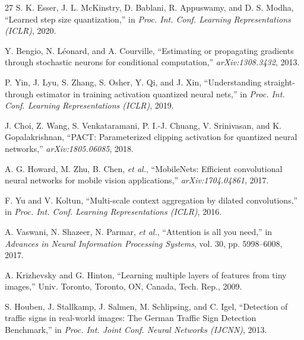 \documentclass[lettersize,journal]{IEEEtran}
\begin{document}
\begin{thebibliography}{27}
S. K. Esser, J. L. McKinstry, D. Bablani, R. Appuswamy, and D. S. Modha, ``Learned step size quantization,'' in \emph{Proc. Int. Conf. Learning Representations (ICLR)}, 2020.

Y. Bengio, N. L\'eonard, and A. Courville, ``Estimating or propagating gradients through stochastic neurons for conditional computation,'' \emph{arXiv:1308.3432}, 2013.

P. Yin, J. Lyu, S. Zhang, S. Osher, Y. Qi, and J. Xin, ``Understanding straight-through estimator in training activation quantized neural nets,'' in \emph{Proc. Int. Conf. Learning Representations (ICLR)}, 2019.

J. Choi, Z. Wang, S. Venkataramani, P. I.-J. Chuang, V. Srinivasan, and K. Gopalakrishnan, ``PACT: Parameterized clipping activation for quantized neural networks,'' \emph{arXiv:1805.06085}, 2018.

A. G. Howard, M. Zhu, B. Chen, \emph{et al.}, ``MobileNets: Efficient convolutional neural networks for mobile vision applications,'' \emph{arXiv:1704.04861}, 2017.

F. Yu and V. Koltun, ``Multi-scale context aggregation by dilated convolutions,'' in \emph{Proc. Int. Conf. Learning Representations (ICLR)}, 2016.

A. Vaswani, N. Shazeer, N. Parmar, \emph{et al.}, ``Attention is all you need,'' in \emph{Advances in Neural Information Processing Systems}, vol. 30, pp. 5998--6008, 2017.

A. Krizhevsky and G. Hinton, ``Learning multiple layers of features from tiny images,'' Univ. Toronto, Toronto, ON, Canada, Tech. Rep., 2009.

S. Houben, J. Stallkamp, J. Salmen, M. Schlipsing, and C. Igel, ``Detection of traffic signs in real-world images: The German Traffic Sign Detection Benchmark,'' in \emph{Proc. Int. Joint Conf. Neural Networks (IJCNN)}, 2013.

\end{thebibliography}
\end{document}
